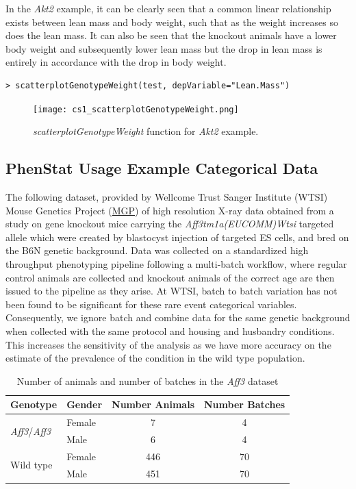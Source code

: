 \documentclass[12pt,a4paper]{article}
\begin{document}
In the \textit{Akt2} example, it can be clearly seen that a common linear relationship exists between lean mass and body weight, such that as the weight increases so does the lean mass. 
It can also be seen that the knockout animals have a lower body weight and subsequently lower lean mass but the drop in lean mass is entirely in accordance with the drop in body weight. 

\begingroup
    \fontsize{8pt}{12pt}\selectfont
\begin{verbatim}
> scatterplotGenotypeWeight(test, depVariable="Lean.Mass")
\end{verbatim}
\endgroup 

\begin{figure}[H]%
\centerline{\texttt{[image: cs1\_scatterplotGenotypeWeight.png]}}
\caption{\textit{scatterplotGenotypeWeight} function for \textit{Akt2} example.}\label{fig:23}
\end{figure}

\subsection{PhenStat Usage Example Categorical Data}
The following dataset, provided by Wellcome Trust Sanger Institute (WTSI) Mouse Genetics Project (\href{http://www.sanger.ac.uk/resources/mouse/}{MGP}) of high resolution X-ray data obtained from 
a study on gene knockout mice carrying the \textit{Aff3tm1a(EUCOMM)Wtsi} targeted allele which were created by blastocyst injection of targeted ES cells, and bred on the B6N genetic background. 
Data was collected on a standardized high throughput phenotyping pipeline following a multi-batch workflow, where regular control animals are collected and knockout animals of the correct age are then issued to the pipeline as they arise. 
At WTSI, batch to batch variation has not been found to be significant for these rare event categorical variables. 
Consequently, we ignore batch and combine data for the same genetic background when collected with the same protocol and housing and husbandry conditions. 
This increases the sensitivity of the analysis as we have more accuracy on the estimate of the prevalence of the condition in the wild type population.

\begin{table}[!h]
\begin{center}
\begin{tabular}{| l | l | c | c |}
  \hline
Genotype&Gender&Number Animals&Number Batches\\\hline
\multirow{2}{*}{\textit{Aff3}\slash \textit{Aff3}}&Female&7&4\\
			    &Male&6&4\\
			    \hline
\multirow{2}{*}{Wild type}&Female&446&70\\
			    &Male&451&70\\

\hline  
\end{tabular}
\caption{Number of animals and number of batches in the \textit{Aff3} dataset}\label{table:09}
\end{center}
\end{table}
\end{document}
